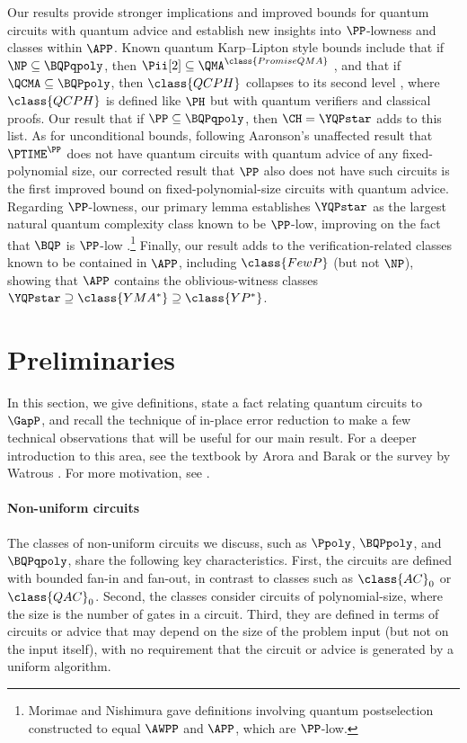Our results provide stronger implications and improved bounds for quantum circuits
with quantum advice
and establish new insights into
$\PP$-lowness and classes within $\APP$.
Known quantum Karp--Lipton style bounds include that if
$\NP\subseteq \BQPqpoly$, then
$\Pii[2] \subseteq \QMA^{\class{PromiseQMA}}$ \cite{aaronson2014full},
and that if
$\QCMA\subseteq \BQPpoly$, then $\class{QCPH}$ collapses
to its second level \cite{agarwal2024quantum},
where $\class{QCPH}$ is defined like $\PH$ but with quantum verifiers and classical proofs.
Our result that if $\PP\subseteq \BQPqpoly$, then $\CH = \YQPstar$ adds to this list.
As for unconditional bounds, following Aaronson's unaffected result that
$\PTIME^\PP$ does not have quantum circuits with quantum advice of any %
fixed-polynomial %
size, our corrected result that $\PP$ also does not have such circuits is the first improved bound
on %
fixed-polynomial-size  %
circuits with quantum advice.
Regarding $\PP$-lowness, our primary lemma establishes $\YQPstar$ as the largest
natural quantum complexity class known to be $\PP$-low,
improving on the fact that $\BQP$ is $\PP$-low \cite{fortnow1999complexity}.\footnote{Morimae and Nishimura \cite{morimae16}
	gave definitions involving quantum postselection constructed to equal $\AWPP$
	and $\APP$, which are $\PP$-low.}
Finally, our result adds to the verification-related classes known to be contained in $\APP$,
including $\class{FewP}$ \cite{li1993counting} (but not $\NP$),
showing that $\APP$ contains the oblivious-witness classes
$\YQPstar\supseteq\class{YMA^*}\supseteq\class{YP^*}$.



%
\section{Preliminaries}

In this section, we give definitions, state a fact relating quantum circuits to $\GapP$,
and recall the technique of in-place error reduction
to make a few technical observations that will be useful for our main result.
For a deeper introduction to this area,
see the textbook by Arora and Barak \cite{arora2009computational} or the survey by Watrous \cite{watrous2008quantum}.
For more motivation, see
\cite{aaronson_subtle,aaronson2014full}.


\paragraph{Non-uniform circuits}
The classes of non-uniform circuits we discuss, such as $\Ppoly$, $\BQPpoly$, and $\BQPqpoly$,
share the following key characteristics.
First, the circuits are defined with bounded fan-in and fan-out, in contrast to
classes such as $\class{AC}_0$ or $\class{QAC}_0$.
Second, the classes consider circuits of polynomial-size,
where the size is the number of gates in a circuit.
Third, they are defined in terms of circuits or advice that may depend
on the size of the problem input (but not on the input itself),
with no requirement that the circuit or advice is generated by a uniform algorithm.

